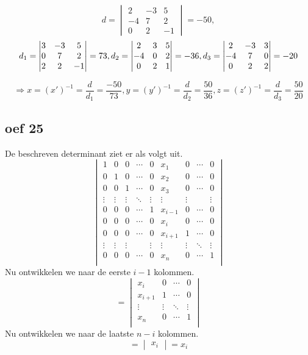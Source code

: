\documentclass[lineaire_algebra_oplossingen.tex]{subfiles}
\begin{document}
\[  d = \begin{vmatrix}
            2 & -3 & 5\\
            -4 & 7 & 2\\
            0 & 2 & -1
    \end{vmatrix} = -50,\]
\[  d_1 = \begin{vmatrix}
        3 & -3 & 5\\
        0 & 7 & 2\\
        2 & 2 & -1
    \end{vmatrix} = 73,\\
    d_2 = \begin{vmatrix}
        2 & 3 & 5\\
        -4 & 0 & 2\\
        0 & 2 & 1
    \end{vmatrix} = -36,\\
    d_3 = \begin{vmatrix}
        2 & -3 & 3\\
        -4 & 7 & 0\\
        0 & 2 & 2
    \end{vmatrix} = -20
\]

\[\Rightarrow x = (x')^{-1}= \frac{d}{d_1} = \frac{-50}{73},
    y = (y')^{-1}= \frac{d}{d_2} = \frac{50}{36},
    z = (z')^{-1}= \frac{d}{d_3} = \frac{50}{20}
\]

\subsection{oef 25}
De beschreven determinant ziet er als volgt uit.
\[
\begin{vmatrix}
1 & 0 & 0 & \cdots & 0 & x_1 & 0 & \cdots & 0 \\
0 & 1 & 0 & \cdots & 0 & x_2 & 0 & \cdots & 0 \\
0 & 0 & 1 & \cdots & 0 & x_3 & 0 & \cdots & 0 \\
\vdots & \vdots & \vdots & \ddots  & \vdots & \vdots & \vdots &  & \vdots\\
0 & 0 & 0 & \cdots & 1 & x_{i-1} & 0 &\cdots & 0 \\
0 & 0 & 0 & \cdots & 0 & x_i & 0 & \cdots & 0 \\
0 & 0 & 0 & \cdots & 0 & x_{i+1} & 1 & \cdots & 0 \\
\vdots & \vdots & \vdots &  & \vdots & \vdots & \vdots & \ddots & \vdots\\
0 & 0 & 0 & \cdots & 0 & x_n & 0 & \cdots & 1\\
\end{vmatrix}
\]
Nu ontwikkelen we naar de eerste $i-1$ kolommen.
\[
= 
\begin{vmatrix}
x_i & 0 & \cdots & 0 \\
x_{i+1} & 1 & \cdots & 0 \\
\vdots & \vdots & \ddots & \vdots\\
 x_n & 0 & \cdots & 1\\
\end{vmatrix}
\]
Nu ontwikkelen we naar de laatste $n -i$ kolommen.
\[
= 
\begin{vmatrix}
x_i
\end{vmatrix}
= x_i
\]
\end{document}
